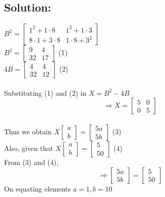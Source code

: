 \documentclass[journal,11pt,twocolumn]{article}
\begin{document}
\subsection*{Solution:}
    $B^2 = \begin{bmatrix} 1^2+1\cdot8 & 1^2+1\cdot3\\8\cdot1+3\cdot8 & 1\cdot8+3^2 \end{bmatrix}$
    \\
    $B^2 = \begin{bmatrix} 9 & 4\\32 & 17 \end{bmatrix}$  
    \hfill (1)
    \\
    $4B = \begin{bmatrix} 4 & 4\\ 32 & 12 \end{bmatrix}$
    \hfill (2)
    \\
    \\
    Substituting (1) and (2) in $X = B^2-4B$
    \[\Rightarrow X = \begin{bmatrix} 5 & 0\\0 & 5 \end{bmatrix}\]
    \\
    Thus we obtain $X \begin{bmatrix}a\\b\end{bmatrix}
    = \begin{bmatrix}5a\\5b\end{bmatrix}$
    \hfill (3)
    \\
    Also, given that $X \begin{bmatrix}a\\b\end{bmatrix}
    = \begin{bmatrix} 5\\50 \end{bmatrix} $
    \hfill (4)
    \\
    From (3) and (4),
    \[ \Rightarrow \begin{bmatrix}5a\\5b\end{bmatrix} 
    =\begin{bmatrix} 5\\50 \end{bmatrix} \]
    On equating elements $a = 1 , b = 10$
\end{document}
